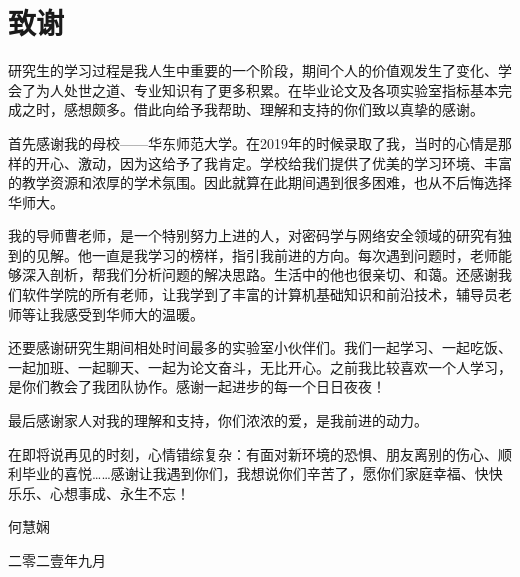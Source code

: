 {\fangsong
	\chapter*{致\qquad 谢}\vskip 2mm
	\vspace{-1cm}
		\large{

研究生的学习过程是我人生中重要的一个阶段，期间个人的价值观发生了变化、学会了为人处世之道、专业知识有了更多积累。在毕业论文及各项实验室指标基本完成之时，感想颇多。借此向给予我帮助、理解和支持的你们致以真挚的感谢。

首先感谢我的母校——华东师范大学。在2019年的时候录取了我，当时的心情是那样的开心、激动，因为这给予了我肯定。学校给我们提供了优美的学习环境、丰富的教学资源和浓厚的学术氛围。因此就算在此期间遇到很多困难，也从不后悔选择华师大。

我的导师曹老师，是一个特别努力上进的人，对密码学与网络安全领域的研究有独到的见解。他一直是我学习的榜样，指引我前进的方向。每次遇到问题时，老师能够深入剖析，帮我们分析问题的解决思路。生活中的他也很亲切、和蔼。还感谢我们软件学院的所有老师，让我学到了丰富的计算机基础知识和前沿技术，辅导员老师等让我感受到华师大的温暖。

还要感谢研究生期间相处时间最多的实验室小伙伴们。我们一起学习、一起吃饭、一起加班、一起聊天、一起为论文奋斗，无比开心。之前我比较喜欢一个人学习，是你们教会了我团队协作。感谢一起进步的每一个日日夜夜！

最后感谢家人对我的理解和支持，你们浓浓的爱，是我前进的动力。

在即将说再见的时刻，心情错综复杂：有面对新环境的恐惧、朋友离别的伤心、顺利毕业的喜悦……感谢让我遇到你们，我想说你们辛苦了，愿你们家庭幸福、快快乐乐、心想事成、永生不忘！	
	}
	
	\vspace{0.2cm}
	
	\vspace{0.2cm} \hspace{9.8cm}
	何慧娴
	
	\hspace{9cm}  二零二壹年九月

} 